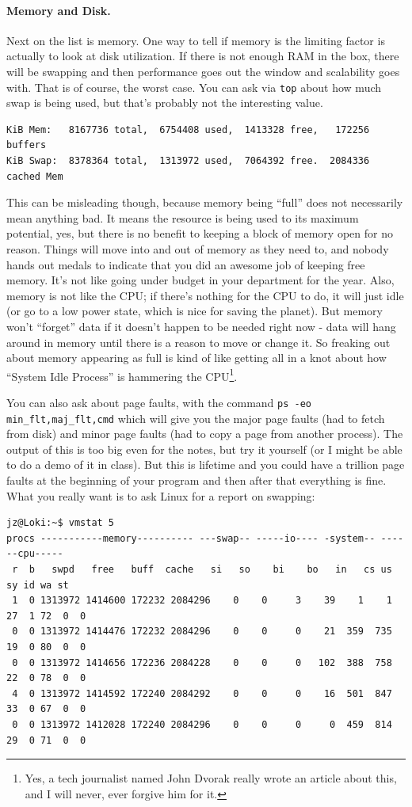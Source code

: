 \documentclass[a4paper]{report}
\begin{document}
\paragraph{Memory and Disk.} Next on the list is memory. One way to tell if memory is the limiting factor is actually to look at disk utilization. If there is not enough RAM in the box, there will be swapping and then performance goes out the window and scalability goes with. That is of course, the worst case. You can ask via \texttt{top} about how much swap is being used, but that's probably not the interesting value. 

\begin{verbatim}
KiB Mem:   8167736 total,  6754408 used,  1413328 free,   172256 buffers
KiB Swap:  8378364 total,  1313972 used,  7064392 free.  2084336 cached Mem
\end{verbatim}

This can be misleading though, because memory being ``full'' does not necessarily mean anything bad. It means the resource is being used to its maximum potential, yes, but there is no benefit to keeping a block of memory open for no reason. Things will move into and out of memory as they need to, and nobody hands out medals to indicate that you did an awesome job of keeping free memory. It's not like going under budget in your department for the year.  Also, memory is not like the CPU; if there's nothing for the CPU to do, it will just idle (or go to a low power state, which is nice for saving the planet). But memory won't ``forget'' data if it doesn't happen to be needed right now - data will hang around in memory until there is a reason to move or change it. So freaking out about memory appearing as full is kind of like getting all in a knot about how ``System Idle Process'' is hammering the CPU\footnote{Yes, a tech journalist named John Dvorak really wrote an article about this, and I will never, ever forgive him for it.}.

You can also ask about page faults, with the command \texttt{ps -eo min\_flt,maj\_flt,cmd} which will give you the major page faults (had to fetch from disk) and minor page faults (had to copy a page from another process). The output of this is too big even for the notes, but try it yourself (or I might be able to do a demo of it in class). But this is lifetime and you could have a trillion page faults at the beginning of your program and then after that everything is fine. What you really want is to ask Linux for a report on swapping:

\begin{verbatim}
jz@Loki:~$ vmstat 5
procs -----------memory---------- ---swap-- -----io---- -system-- ------cpu-----
 r  b   swpd   free   buff  cache   si   so    bi    bo   in   cs us sy id wa st
 1  0 1313972 1414600 172232 2084296    0    0     3    39    1    1 27  1 72  0  0
 0  0 1313972 1414476 172232 2084296    0    0     0    21  359  735 19  0 80  0  0
 0  0 1313972 1414656 172236 2084228    0    0     0   102  388  758 22  0 78  0  0
 4  0 1313972 1414592 172240 2084292    0    0     0    16  501  847 33  0 67  0  0
 0  0 1313972 1412028 172240 2084296    0    0     0     0  459  814 29  0 71  0  0
\end{verbatim}
\end{document}

